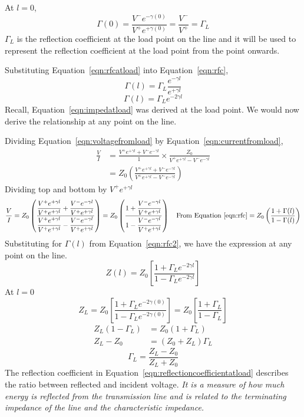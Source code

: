 At $l = 0$,
\begin{dmath}
\Gamma (0) = \frac{V^-e^{-\gamma (0)}}{V^+e^{+\gamma (0)}}
= \frac{V^-}{V^+}
= \Gamma_L
\label{eqn:rfcatload}
\end{dmath}
$\Gamma_L$ is the reflection coefficient at the load point on the line and it will be used to represent the reflection coefficient at the load point from the point onwards.

Substituting Equation~\eqref{eqn:rfcatload} into Equation~\eqref{eqn:rfc},
\begin{equation*}
\Gamma (l) = \Gamma_L\frac{e^{-\gamma l}}{e^{+\gamma l}}
\end{equation*}
\begin{equation}
\Gamma (l) = \Gamma_L e^{-2\gamma l}
\label{eqn:rfc2}
\end{equation}
Recall, Equation~\eqref{eqn:impedatload} was derived at the load point. We would now derive the relationship at any point on the line.

Dividing Equation~\eqref{eqn:voltagefromload} by Equation~\eqref{eqn:currentfromload},
\begin{align*}
\frac{V}{I} &= \frac{V^+e^{+\gamma l}+V^-e^{-\gamma l}}{1}\times \frac{Z_0}{V^+e^{+\gamma l}-V^-e^{-\gamma l}}\\
&= Z_0\left( \frac{V^+e^{+\gamma l}+V^-e^{-\gamma l}}{V^+e^{+\gamma l}-V^-e^{-\gamma l}}\right) 
\end{align*}
Dividing top and bottom by $V^+e^{+\gamma l}$
\begin{dmath*}
\frac{V}{I} = Z_0\left( \frac{\dfrac{V^+e^{+\gamma l}}{V^+e^{+\gamma l}}+\dfrac{V^-e^{-\gamma l}}{V^+e^{+\gamma l}}}{\dfrac{V^+e^{+\gamma l}}{V^+e^{+\gamma l}}-\dfrac{V^-e^{-\gamma l}}{V^+e^{+\gamma l}}}\right)
= Z_0\left( \frac{1 + \dfrac{V^-e^{-\gamma l}}{V^+e^{+\gamma l}}}{1 - \dfrac{V^-e^{-\gamma l}}{V^+e^{+\gamma l}}}\right)\quad\text{From Equation~\ref{eqn:rfc}}
=Z_0\left( \frac{1+\Gamma (l)}{1 -\Gamma (l)}\right)
\end{dmath*}
Substituting for $\Gamma (l)$ from Equation~\eqref{eqn:rfc2}, we have the expression at any point on the line.
\begin{equation}
Z(l) = Z_0\left[ \frac{1 + \Gamma_L e^{-2\gamma l}}{1 - \Gamma_L e^{-2\gamma l}}\right] 
\end{equation}
At $l = 0$ 
\begin{dmath}
Z_L = Z_0\left[ \frac{1 + \Gamma_L e^{-2\gamma (0)}}{1 - \Gamma_L e^{-2\gamma (0)}}\right] 
= Z_0\left[\frac{1 + \Gamma_L}{1 - \Gamma_L}\right] 
\end{dmath}
\begin{align*}
Z_L(1 - \Gamma_L) &= Z_0(1 + \Gamma_L)\\
Z_L - Z_0 &= (Z_0 + Z_L)\Gamma_L
\end{align*}
\begin{equation}
\Gamma_L = \frac{Z_L - Z_0}{Z_L + Z_0}
\label{eqn:reflectioncoefficientatload}
\end{equation}
The reflection coefficient in Equation~\eqref{eqn:reflectioncoefficientatload} describes the ratio between reflected and incident voltage. \emph{It is a measure of how much energy is reflected from the transmission line and is related to the terminating impedance of the line and the characteristic impedance.}


